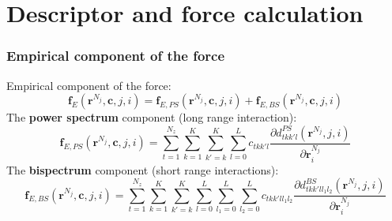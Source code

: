 \documentclass[10pt]{beamer}
\theoremstyle{remark}
\theoremstyle{definition}
\begin{document}

\section{Descriptor and force calculation}


\begin{frame}
\frametitle{Empirical component of the force}

Empirical component of the force:
\begin{equation*}
    \bm f_E(\bm {r}^{N_j}, \bm c, j, i) = 
    \bm f_{E,PS}(\bm {r}^{N_j}, \bm c, j, i) +
    \bm f_{E,BS}(\bm {r}^{N_j}, \bm c, j, i)
    \label{eq:force}
\end{equation*}
\pause
The \textbf{power spectrum} component (long range interaction):
\begin{equation*}
    \bm f_{E,PS}(\bm {r}^{N_j}, \bm c, j, i) = 
    \sum_{t=1}^{N_z}
    \sum_{k=1}^K
    \sum_{k'=k}^{K}
    \sum_{l=0}^L
    c_{tkk'l}
    \frac{\partial d^{PS}_{tkk'l}(\bm r^{N_j}, j, i)}{\partial \bm r^{N_j}_i}
    \label{eq:force}
\end{equation*}
\pause
The \textbf{bispectrum} component (short range interactions):
\begin{equation*}
    \bm f_{E,BS}(\bm {r}^{N_j}, \bm c, j, i) = 
    \sum_{t=1}^{N_z}
    \sum_{k=1}^K
    \sum_{k'=k}^{K}
    \sum_{l=0}^L
    \sum_{l_1=0}^L
    \sum_{l_2=0}^L
    c_{tkk'l{l_1}{l_2}}
    \frac{\partial d^{BS}_{tkk'l{l_1}{l_2}}(\bm r^{N_j}, j, i)}{\partial \bm r^{N_j}_i}
    \label{eq:force}
\end{equation*}


\end{frame}
 
 
\end{document}
